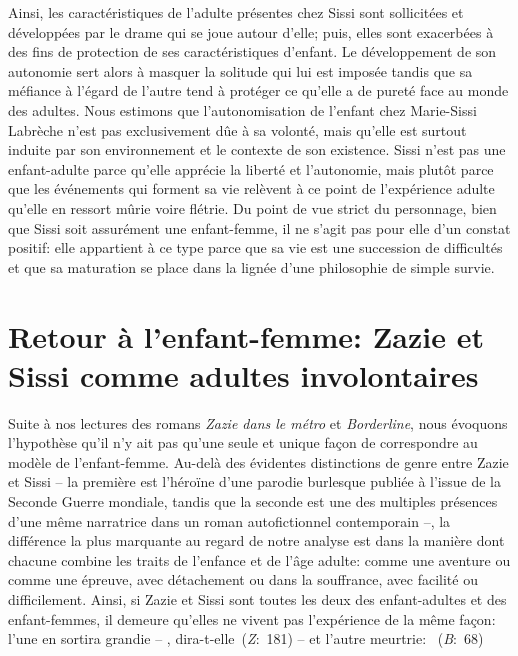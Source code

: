 \par
Ainsi, les caractéristiques de l'adulte présentes chez Sissi sont sollicitées et développées par le drame qui se joue autour d'elle; puis, elles sont exacerbées à des fins de protection de ses caractéristiques d'enfant.
Le développement de son autonomie sert alors à masquer la solitude qui lui est imposée tandis que sa méfiance à l'égard de l'autre tend à protéger ce qu'elle a de pureté face au monde des adultes.
Nous estimons que l'autonomisation de l'enfant chez Marie-Sissi Labrèche n'est pas exclusivement dûe à sa volonté, mais qu'elle est surtout induite par son environnement et le contexte de son existence.
Sissi n'est pas une enfant-adulte parce qu'elle apprécie la liberté et l'autonomie, mais plutôt parce que les événements qui forment sa vie relèvent à ce point de l'expérience adulte qu'elle en ressort mûrie voire flétrie.
Du point de vue strict du personnage, bien que Sissi soit assurément une enfant-femme, il ne s'agit pas pour elle d'un constat positif: elle appartient à ce type parce que sa vie est une succession de difficultés et que sa maturation se place dans la lignée d'une philosophie de simple survie.


\section{Retour à l'enfant-femme: Zazie et Sissi comme adultes involontaires}
Suite à nos lectures des romans \textit{Zazie dans le métro} et \textit{Borderline}, nous évoquons l'hypothèse qu'il n'y ait pas qu'une seule et unique façon de correspondre au modèle de l'enfant-femme.
Au-delà des évidentes distinctions de genre entre Zazie et Sissi -- la première est l'héroïne d'une parodie burlesque publiée à l'issue de la Seconde Guerre mondiale, tandis que la seconde est une des multiples présences d'une même narratrice dans un roman autofictionnel contemporain --, la différence la plus marquante au regard de notre analyse est dans la manière dont chacune combine les traits de l'enfance et de l'âge adulte: comme une aventure ou comme une épreuve, avec détachement ou dans la souffrance, avec facilité ou difficilement.
Ainsi, si Zazie et Sissi sont toutes les deux des enfant-adultes et des enfant-femmes, il demeure qu'elles ne vivent pas l'expérience de la même façon: l'une en sortira grandie -- , dira-t-elle~(\textit{Z}:~181) -- et l'autre meurtrie: ~(\textit{B}:~68)


